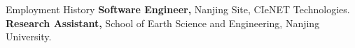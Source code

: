 \begin{rubric}{Employment History}
\entry*[2017 -- 2018]%
	\textbf{Software Engineer,} Nanjing Site, CIeNET Technologies.
%
%
\entry*[2016 -- 2017]%
	\textbf{Research Assistant,} School of Earth Science and Engineering, Nanjing University.
%
\end{rubric}